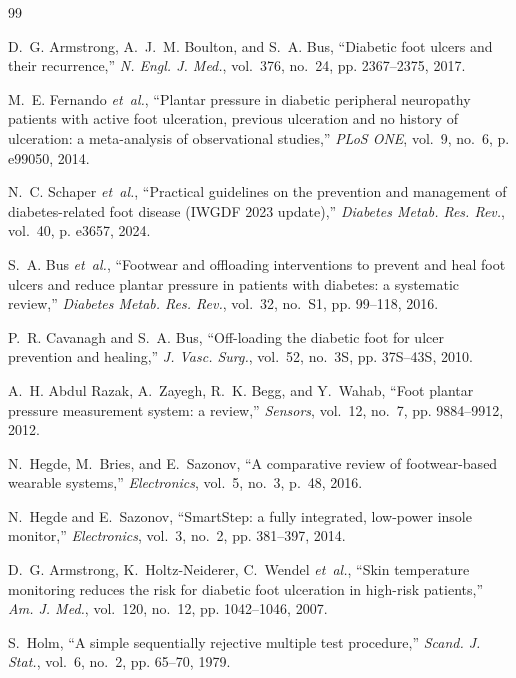 \documentclass[10pt,conference,a4paper]{IEEEtran}
\begin{document}
\begin{thebibliography}{99}
\footnotesize
\setlength{\itemsep}{0pt plus 0.2pt}

D.~G. Armstrong, A.~J.~M. Boulton, and S.~A. Bus, ``Diabetic foot ulcers and
their recurrence,'' \emph{N. Engl. J. Med.}, vol.~376, no.~24, pp.
2367--2375, 2017.

M.~E. Fernando \emph{et~al.}, ``Plantar pressure in diabetic peripheral
neuropathy patients with active foot ulceration, previous ulceration and no
history of ulceration: a meta-analysis of observational studies,''
\emph{PLoS ONE}, vol.~9, no.~6, p. e99050, 2014.

N.~C. Schaper \emph{et~al.}, ``Practical guidelines on the prevention and
management of diabetes-related foot disease (IWGDF 2023 update),''
\emph{Diabetes Metab. Res. Rev.}, vol.~40, p. e3657, 2024.

S.~A. Bus \emph{et~al.}, ``Footwear and offloading interventions to prevent and
heal foot ulcers and reduce plantar pressure in patients with diabetes: a
systematic review,'' \emph{Diabetes Metab. Res. Rev.}, vol.~32, no.~S1, pp.
99--118, 2016.

P.~R. Cavanagh and S.~A. Bus, ``Off-loading the diabetic foot for ulcer
prevention and healing,'' \emph{J. Vasc. Surg.}, vol.~52, no.~3S, pp.
37S--43S, 2010.

A.~H. Abdul Razak, A.~Zayegh, R.~K. Begg, and Y.~Wahab, ``Foot plantar pressure
measurement system: a review,'' \emph{Sensors}, vol.~12, no.~7, pp.
9884--9912, 2012.

N.~Hegde, M.~Bries, and E.~Sazonov, ``A comparative review of footwear-based
wearable systems,'' \emph{Electronics}, vol.~5, no.~3, p.~48, 2016.

N.~Hegde and E.~Sazonov, ``SmartStep: a fully integrated, low-power insole
monitor,'' \emph{Electronics}, vol.~3, no.~2, pp. 381--397, 2014.

D.~G. Armstrong, K.~Holtz-Neiderer, C.~Wendel \emph{et~al.}, ``Skin temperature
monitoring reduces the risk for diabetic foot ulceration in high-risk
patients,'' \emph{Am. J. Med.}, vol.~120, no.~12, pp. 1042--1046, 2007.

S.~Holm, ``A simple sequentially rejective multiple test procedure,''
\emph{Scand. J. Stat.}, vol.~6, no.~2, pp. 65--70, 1979.


\end{thebibliography}
\end{document}
